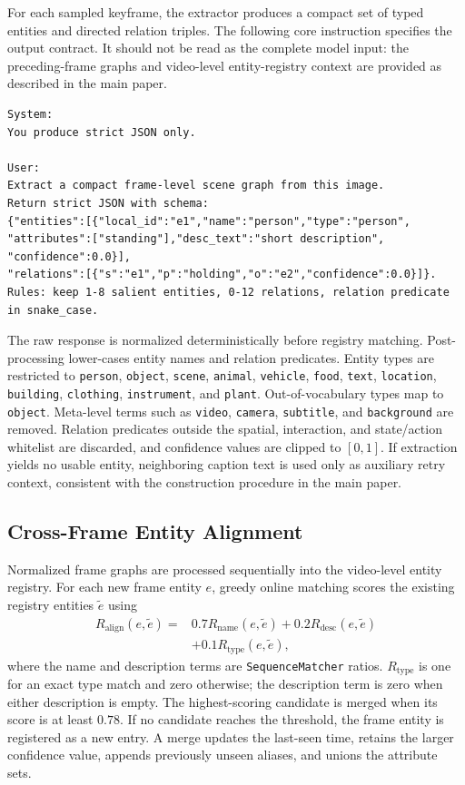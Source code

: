 \documentclass[letterpaper]{article}
\begin{document}
For each sampled keyframe, the extractor produces a compact set of typed entities and directed relation triples.
The following core instruction specifies the output contract.
It should not be read as the complete model input: the preceding-frame graphs and video-level entity-registry context are provided as described in the main paper.

\begin{lstlisting}
System:
You produce strict JSON only.

User:
Extract a compact frame-level scene graph from this image.
Return strict JSON with schema:
{"entities":[{"local_id":"e1","name":"person","type":"person",
"attributes":["standing"],"desc_text":"short description",
"confidence":0.0}],
"relations":[{"s":"e1","p":"holding","o":"e2","confidence":0.0}]}.
Rules: keep 1-8 salient entities, 0-12 relations, relation predicate in snake_case.
\end{lstlisting}

The raw response is normalized deterministically before registry matching.
Post-processing lower-cases entity names and relation predicates.
Entity types are restricted to \texttt{person}, \texttt{object}, \texttt{scene}, \texttt{animal}, \texttt{vehicle}, \texttt{food}, \texttt{text}, \texttt{location}, \texttt{building}, \texttt{clothing}, \texttt{instrument}, and \texttt{plant}.
Out-of-vocabulary types map to \texttt{object}.
Meta-level terms such as \texttt{video}, \texttt{camera}, \texttt{subtitle}, and \texttt{background} are removed.
Relation predicates outside the spatial, interaction, and state/action whitelist are discarded, and confidence values are clipped to $[0,1]$.
If extraction yields no usable entity, neighboring caption text is used only as auxiliary retry context, consistent with the construction procedure in the main paper.

\subsection{Cross-Frame Entity Alignment}

Normalized frame graphs are processed sequentially into the video-level entity registry.
For each new frame entity $e$, greedy online matching scores the existing registry entities $\tilde e$ using
\begin{equation}
  \begin{split}
  R_{\mathrm{align}}(e,\tilde e)
  ={}&0.7R_{\mathrm{name}}(e,\tilde e)
  +0.2R_{\mathrm{desc}}(e,\tilde e)\\
  &+0.1R_{\mathrm{type}}(e,\tilde e),
  \end{split}
  \label{eq:supp-alignment}
\end{equation}
where the name and description terms are \texttt{SequenceMatcher} ratios.
$R_{\mathrm{type}}$ is one for an exact type match and zero otherwise; the description term is zero when either description is empty.
The highest-scoring candidate is merged when its score is at least $0.78$.
If no candidate reaches the threshold, the frame entity is registered as a new entry.
A merge updates the last-seen time, retains the larger confidence value, appends previously unseen aliases, and unions the attribute sets.
\end{document}
